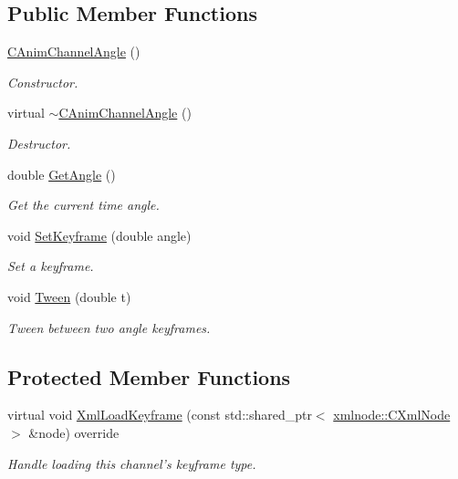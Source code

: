 \subsection*{Public Member Functions}
\begin{DoxyCompactItemize}
\item 
\hypertarget{class_c_anim_channel_angle_a408925f5093ef5bca8bcebc2917fe577}{\hyperlink{class_c_anim_channel_angle_a408925f5093ef5bca8bcebc2917fe577}{C\+Anim\+Channel\+Angle} ()}\label{class_c_anim_channel_angle_a408925f5093ef5bca8bcebc2917fe577}

\begin{DoxyCompactList}\small\item\em Constructor. \end{DoxyCompactList}\item 
\hypertarget{class_c_anim_channel_angle_aa6fd09295d3868da87a06b4173fdc955}{virtual \hyperlink{class_c_anim_channel_angle_aa6fd09295d3868da87a06b4173fdc955}{$\sim$\+C\+Anim\+Channel\+Angle} ()}\label{class_c_anim_channel_angle_aa6fd09295d3868da87a06b4173fdc955}

\begin{DoxyCompactList}\small\item\em Destructor. \end{DoxyCompactList}\item 
double \hyperlink{class_c_anim_channel_angle_a0fda0dabc9e7d7a44760b75aab85abf4}{Get\+Angle} ()
\begin{DoxyCompactList}\small\item\em Get the current time angle. \end{DoxyCompactList}\item 
void \hyperlink{class_c_anim_channel_angle_a20bb427cc1a790d1449f770ac413dc95}{Set\+Keyframe} (double angle)
\begin{DoxyCompactList}\small\item\em Set a keyframe. \end{DoxyCompactList}\item 
void \hyperlink{class_c_anim_channel_angle_a2fe6ecc9f2cc1629efa18c33d2742e4d}{Tween} (double t)
\begin{DoxyCompactList}\small\item\em Tween between two angle keyframes. \end{DoxyCompactList}\end{DoxyCompactItemize}
\subsection*{Protected Member Functions}
\begin{DoxyCompactItemize}
\item 
virtual void \hyperlink{class_c_anim_channel_angle_a7c56ed07ead2eab289e07dbd39c1bf90}{Xml\+Load\+Keyframe} (const std\+::shared\+\_\+ptr$<$ \hyperlink{classxmlnode_1_1_c_xml_node}{xmlnode\+::\+C\+Xml\+Node} $>$ \&node) override
\begin{DoxyCompactList}\small\item\em Handle loading this channel's keyframe type. \end{DoxyCompactList}\end{DoxyCompactItemize}


